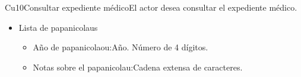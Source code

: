 \begin{UseCase}{Cu10}{Consultar expediente médico}{El actor desea consultar el expediente médico.}
{\begin{itemize}
        \begin{itemize}
            \item Mastografía:Cadena de caracteres.
            \item Año de realización de  mastografía: Año. Número de 4 dígitos.
            \item Notas sobre la mastografía:Cadena extensa de caracteres.
        \end{itemize}
            
        \item Lista de papanicolaus
        
        \begin{itemize}
            \item Año de papanicolaou:Año. Número de 4 dígitos.
            \item Notas sobre el papanicolau:Cadena extensa de caracteres.
        \end{itemize}
        
        \end{itemize}
}
\end{UseCase}
